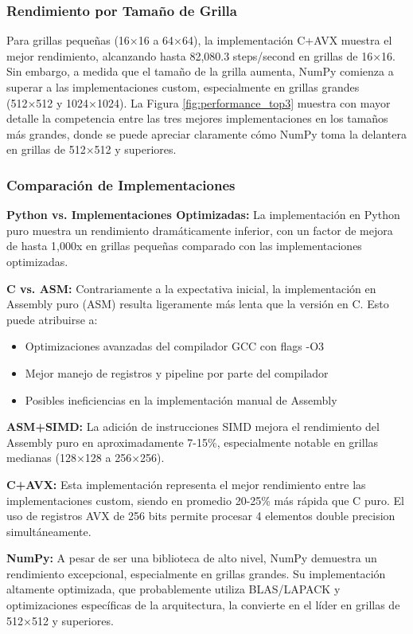 \documentclass[a4paper]{article}
\begin{document}
\subsubsection{Rendimiento por Tamaño de Grilla}

Para grillas pequeñas (16×16 a 64×64), la implementación C+AVX muestra el mejor rendimiento, alcanzando hasta 82,080.3 steps/second en grillas de 16×16. Sin embargo, a medida que el tamaño de la grilla aumenta, NumPy comienza a superar a las implementaciones custom, especialmente en grillas grandes (512×512 y 1024×1024). La Figura \ref{fig:performance_top3} muestra con mayor detalle la competencia entre las tres mejores implementaciones en los tamaños más grandes, donde se puede apreciar claramente cómo NumPy toma la delantera en grillas de 512×512 y superiores.

\subsubsection{Comparación de Implementaciones}

\textbf{Python vs. Implementaciones Optimizadas:} La implementación en Python puro muestra un rendimiento dramáticamente inferior, con un factor de mejora de hasta 1,000x en grillas pequeñas comparado con las implementaciones optimizadas.

\textbf{C vs. ASM:} Contrariamente a la expectativa inicial, la implementación en Assembly puro (ASM) resulta ligeramente más lenta que la versión en C. Esto puede atribuirse a:
\begin{itemize}
    \item Optimizaciones avanzadas del compilador GCC con flags -O3
    \item Mejor manejo de registros y pipeline por parte del compilador
    \item Posibles ineficiencias en la implementación manual de Assembly
\end{itemize}

\textbf{ASM+SIMD:} La adición de instrucciones SIMD mejora el rendimiento del Assembly puro en aproximadamente 7-15\%, especialmente notable en grillas medianas (128×128 a 256×256).

\textbf{C+AVX:} Esta implementación representa el mejor rendimiento entre las implementaciones custom, siendo en promedio 20-25\% más rápida que C puro. El uso de registros AVX de 256 bits permite procesar 4 elementos double precision simultáneamente.

\textbf{NumPy:} A pesar de ser una biblioteca de alto nivel, NumPy demuestra un rendimiento excepcional, especialmente en grillas grandes. Su implementación altamente optimizada, que probablemente utiliza BLAS/LAPACK y optimizaciones específicas de la arquitectura, la convierte en el líder en grillas de 512×512 y superiores.
\end{document}
